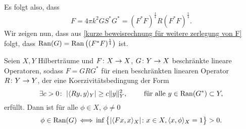 Es folgt also, dass
\begin{equation}
	\label{kurze beweisrechnung für weitere zerlegung von F}
	F = 4\pi k^2GS^\ast G^\ast =(F^\ast F)^\frac{1}{4}R(F^\ast F)^\frac{1}{4}.
\end{equation}
Wir zeigen nun, dass aus \eqref{kurze beweisrechnung für weitere zerlegung von F} folgt, dass \(\operatorname{Ran}(G)=\operatorname{Ran}\big((F^\ast F)^\frac{1}{4}\big)\) ist.
\begin{lem}\label{lem: charakterisierung bild von G (= bild (F*F)^0.25)}
	Seien \(X,Y\) Hilberträume und \(F\colon X \to X\), \(G\colon Y \to X\) beschränkte lineare Operatoren, sodass \(F=GRG^\ast\) für einen beschränkten linearen Operator \(R\colon Y \to Y\), der eine Koerzivitätsbedingung der Form
	\begin{equation}
		\label{koerzivitätsbedingung für R}
		\exists c>0\colon\;|\langle Ry, y\rangle_Y|\geq c\|y\|_Y^2,\qquad\text{ für alle }y\in\operatorname{Ran}(G^\ast)\subset Y,
	\end{equation}
	erfüllt. Dann ist für alle \(\phi\in X\), \(\phi\neq0\)
	\begin{equation}
		\label{charakterisierung bild von G (= bild (F*F)^0.25)}
		\phi\in\operatorname{Ran}(G)\,\Longleftrightarrow\,\inf\big\{|\langle Fx, x\rangle_X|\colon x\in X,\langle x, \phi\rangle_X=1\big\}>0.
	\end{equation}
\end{lem}
